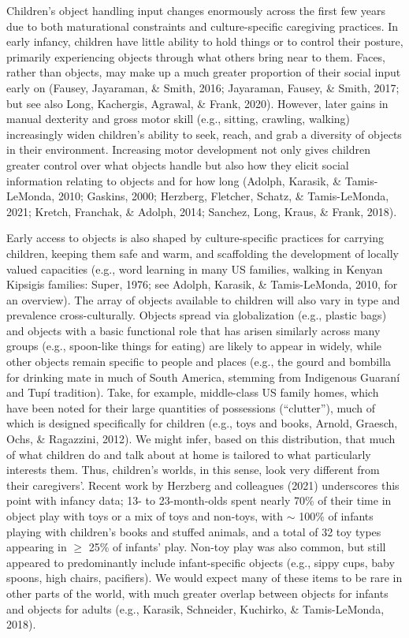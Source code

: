 \documentclass[10pt, letterpaper]{article}
\begin{document}
Children's object handling input changes enormously across the first few
years due to both maturational constraints and culture-specific
caregiving practices. In early infancy, children have little ability to
hold things or to control their posture, primarily experiencing objects
through what others bring near to them. Faces, rather than objects, may
make up a much greater proportion of their social input early on
(Fausey, Jayaraman, \& Smith, 2016; Jayaraman, Fausey, \& Smith, 2017;
but see also Long, Kachergis, Agrawal, \& Frank, 2020). However, later
gains in manual dexterity and gross motor skill (e.g., sitting,
crawling, walking) increasingly widen children's ability to seek, reach,
and grab a diversity of objects in their environment. Increasing motor
development not only gives children greater control over what objects
handle but also how they elicit social information relating to objects
and for how long (Adolph, Karasik, \& Tamis-LeMonda, 2010; Gaskins,
2000; Herzberg, Fletcher, Schatz, \& Tamis-LeMonda, 2021; Kretch,
Franchak, \& Adolph, 2014; Sanchez, Long, Kraus, \& Frank, 2018).

Early access to objects is also shaped by culture-specific practices for
carrying children, keeping them safe and warm, and scaffolding the
development of locally valued capacities (e.g., word learning in many US
families, walking in Kenyan Kipsigis families: Super, 1976; see Adolph,
Karasik, \& Tamis-LeMonda, 2010, for an overview). The array of objects
available to children will also vary in type and prevalence
cross-culturally. Objects spread via globalization (e.g., plastic bags)
and objects with a basic functional role that has arisen similarly
across many groups (e.g., spoon-like things for eating) are likely to
appear in widely, while other objects remain specific to people and
places (e.g., the gourd and bombilla for drinking mate in much of South
America, stemming from Indigenous Guaraní and Tupí tradition). Take, for
example, middle-class US family homes, which have been noted for their
large quantities of possessions (``clutter''), much of which is designed
specifically for children (e.g., toys and books, Arnold, Graesch, Ochs,
\& Ragazzini, 2012). We might infer, based on this distribution, that
much of what children do and talk about at home is tailored to what
particularly interests them. Thus, children's worlds, in this sense,
look very different from their caregivers'. Recent work by Herzberg and
colleagues (2021) underscores this point with infancy data; 13- to
23-month-olds spent nearly 70\% of their time in object play with toys
or a mix of toys and non-toys, with \(\sim\) 100\% of infants playing
with children's books and stuffed animals, and a total of 32 toy types
appearing in \(\ge\) 25\% of infants' play. Non-toy play was also
common, but still appeared to predominantly include infant-specific
objects (e.g., sippy cups, baby spoons, high chairs, pacifiers). We
would expect many of these items to be rare in other parts of the world,
with much greater overlap between objects for infants and objects for
adults (e.g., Karasik, Schneider, Kuchirko, \& Tamis-LeMonda, 2018).
\end{document}
